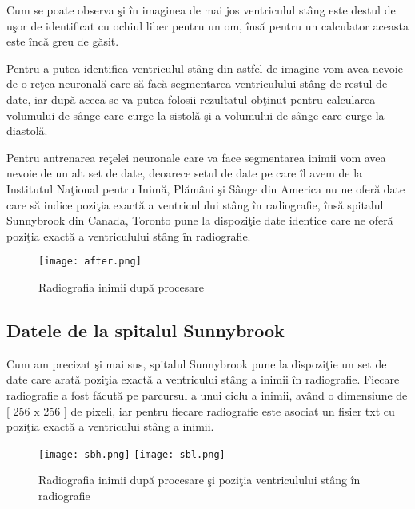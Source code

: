 Cum se poate observa \c{s}i \^{i}n imaginea de mai jos ventriculul st\^{a}ng este destul de u\c{s}or de identificat cu ochiul liber pentru un om, \^{i}ns\u{a} pentru un calculator aceasta este \^{i}nc\u{a} greu de g\u{a}sit.

\par

Pentru a putea identifica ventriculul st\^{a}ng din astfel de imagine vom avea nevoie de o re\c{t}ea neuronal\u{a} care s\u{a} fac\u{a} segmentarea ventriculului st\^{a}ng de restul de date, iar dup\u{a} aceea se va putea folosii rezultatul ob\c{t}inut pentru calcularea volumului de s\^{a}nge care curge la sistol\u{a} \c{s}i a volumului de s\^{a}nge care curge la diastol\u{a}.

\par

Pentru antrenarea re\c{t}elei neuronale care va face segmentarea inimii vom avea nevoie de un alt set de date, deoarece setul de date pe care \^{i}l avem de la Institutul Na\c{t}ional pentru Inim\u{a}, Pl\u{a}m\^{a}ni \c{s}i S\^{a}nge din America nu ne ofer\u{a} date care s\u{a} indice pozi\c{t}ia exact\u{a} a ventriculului st\^{a}ng \^{i}n radiografie, \^{i}ns\u{a} spitalul Sunnybrook din Canada, Toronto pune la dispozi\c{t}ie date identice care ne ofer\u{a} pozi\c{t}ia exact\u{a} a ventriculului st\^{a}ng \^{i}n radiografie.

\begin{figure}[h!]
  \center
  \texttt{[image: after.png]}
  \caption{Radiografia inimii dup\u{a} procesare}
\end{figure}

\subsection{Datele de la spitalul Sunnybrook}

Cum am precizat \c{s}i mai sus, spitalul Sunnybrook pune la dispozi\c{t}ie un set de date care arat\u{a} pozi\c{t}ia exact\u{a} a ventricului st\^{a}ng a inimii \^{i}n radiografie. Fiecare radiografie a fost f\u{a}cut\u{a} pe parcursul a unui ciclu a inimii, av\^{a}nd o dimensiune de [ 256 x 256 ] de pixeli, iar pentru fiecare radiografie este asociat  un fisier txt cu pozi\c{t}ia exact\u{a} a ventricului st\^{a}ng a inimii.

\begin{figure}[h!]
  \center
  \texttt{[image: sbh.png]}
  \texttt{[image: sbl.png]}
  \caption{Radiografia inimii dup\u{a} procesare \c{s}i pozi\c{t}ia ventriculului st\^{a}ng \^{i}n radiografie}
\end{figure}

